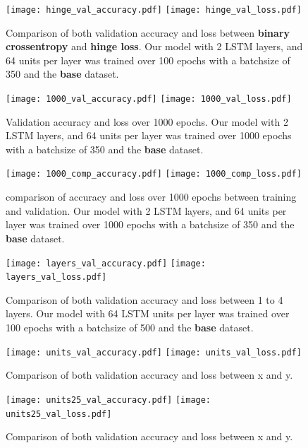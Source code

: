 \documentclass[
	ngerman,
	ruledheaders=section,%
	class=report,%
	thesis={type=bachelor},%
	accentcolor=9c,%
	custommargins=true,%
	marginpar=false,%
	parskip=half-,%
	fontsize=11pt,%
	twoside
]{tudapub}
\begin{document}
\begin{figure}
    \texttt{[image: hinge\_val\_accuracy.pdf]}
    \texttt{[image: hinge\_val\_loss.pdf]}
    \caption{Comparison of both validation accuracy and loss between \textbf{binary crossentropy} and \textbf{hinge loss}.
             Our model with 2 LSTM layers, and 64 units per layer was trained over 100 epochs with a batchsize of 350 and the \textbf{base} dataset.}
    \label{fig:hinge}
\end{figure}

\begin{figure}
    \texttt{[image: 1000\_val\_accuracy.pdf]}
    \texttt{[image: 1000\_val\_loss.pdf]}
    \caption{Validation accuracy and loss over 1000 epochs.
    Our model with 2 LSTM layers, and 64 units per layer was trained over 1000 epochs with a batchsize of 350 and the \textbf{base} dataset.}
    \label{fig:1000epochs}
\end{figure}

\begin{figure}
    \texttt{[image: 1000\_comp\_accuracy.pdf]}
    \texttt{[image: 1000\_comp\_loss.pdf]}
    \caption{comparison of accuracy and loss over 1000 epochs between training and validation.
    Our model with 2 LSTM layers, and 64 units per layer was trained over 1000 epochs with a batchsize of 350 and the \textbf{base} dataset.}
    \label{fig:1000comp}
\end{figure}

\begin{figure}
    \texttt{[image: layers\_val\_accuracy.pdf]}
    \texttt{[image: layers\_val\_loss.pdf]}
    \caption{Comparison of both validation accuracy and loss between 1 to 4 layers.
    Our model with 64 LSTM units per layer was trained over 100 epochs with a batchsize of 500 and the \textbf{base} dataset.}
    \label{fig:layers}
\end{figure}

\begin{figure}
    \texttt{[image: units\_val\_accuracy.pdf]}
    \texttt{[image: units\_val\_loss.pdf]}
    \caption{Comparison of both validation accuracy and loss between x and y.}
    \label{fig:units}
\end{figure}

\begin{figure}
    \texttt{[image: units25\_val\_accuracy.pdf]}
    \texttt{[image: units25\_val\_loss.pdf]}
    \caption{Comparison of both validation accuracy and loss between x and y.}
    \label{fig:units25}
\end{figure}
\end{document}
